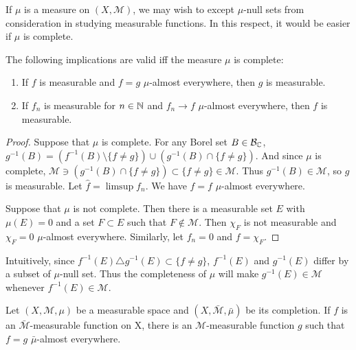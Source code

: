 If $\mu$ is a measure on $(X, \mathcal{M})$, we may wish to except $\mu$-null sets from consideration in studying measurable functions.
In this respect, it would be easier if $\mu$ is complete. 

\begin{proposition}
    The following implications are valid iff the measure $\mu$ is complete:
    \begin{enumerate}
        \item If $f$ is measurable and $f = g$ $\mu$-almost everywhere, then $g$ is measurable.
        \item If $f_n$ is measurable for $n \in \mathbb{N}$ and $f_n \to f$ $\mu$-almost everywhere, then $f$ is measurable.
    \end{enumerate}
\end{proposition}

\begin{proof}
    Suppose that $\mu$ is complete.
    For any Borel set $B \in \mathcal{B}_{\mathbb{C}}$, $g^{-1}(B) = (f^{-1}(B) \setminus \{f \ne g\}) \cup (g^{-1}(B) \cap \{f \ne g\})$.
    And since $\mu$ is complete, $\mathcal{M} \ni (g^{-1}(B) \cap \{f \ne g\}) \subset \{f \ne g\} \in \mathcal{M}$.
    Thus $g^{-1}(B) \in \mathcal{M}$, so $g$ is measurable.
    Let $\hat{f} = \limsup f_n$.
    We have $\hat{f} = f$ $\mu$-almost everywhere.

    Suppose that $\mu$ is not complete. 
    Then there is a measurable set $E$ with $\mu(E) = 0$ and a set $F \subset E$ such that $F \notin \mathcal{M}$.
    Then $\chi_{F}$ is not measurable and $\chi_{F} = 0$ $\mu$-almost everywhere.
    Similarly, let $f_n = 0$ and $f=\chi_{F}$.
\end{proof}

Intuitively, since $f^{-1}(E) \triangle g^{-1}(E) \subset \{ f \ne g \}$, $f^{-1}(E)$ and $g^{-1}(E)$ differ by a subset of $\mu$-null set.
Thus the completeness of $\mu$ will make $g^{-1}(E) \in \mathcal{M}$ whenever $f^{-1}(E) \in \mathcal{M}$.

\begin{proposition}
    Let $(X, \mathcal{M}, \mu)$ be a measurable space and $(X, \bar{\mathcal{M}}, \bar{\mu})$ be its completion.
    If $f$ is an $\bar{\mathcal{M}}$-measurable function on X, there is an $\mathcal{M}$-measurable function $g$ such that $f = g$ $\bar{\mu}$-almost everywhere.
\end{proposition}

